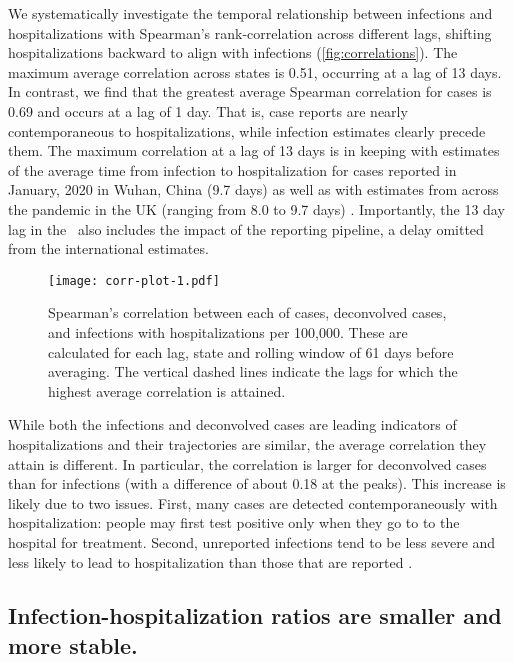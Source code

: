 We systematically investigate the temporal relationship between infections and
hospitalizations with Spearman's rank-correlation across different lags,
shifting hospitalizations backward to align with infections
(\autoref{fig:correlations}). The maximum average correlation across states is
0.51, occurring at a lag of 13 days. In contrast, we find that the greatest
average Spearman correlation for cases is 0.69 and occurs at a lag of 1 day.
That is, case reports are nearly contemporaneous to hospitalizations, while
infection estimates clearly precede them. The maximum correlation at a lag of 13
days is in keeping with estimates of the average time from infection to
hospitalization for cases reported in January, 2020 in Wuhan, China (9.7 days)
as well as with estimates from across the pandemic in the UK (ranging from 8.0
to 9.7 days) \citep{ward2021understanding}. Importantly, the 13 day lag in the
\US\ also includes the impact of the reporting pipeline, a delay omitted from
the international estimates. 

\begin{figure}[!tb]
\centering
\texttt{[image: corr-plot-1.pdf]} 
\caption{Spearman's correlation between each of cases, deconvolved cases, and
infections with hospitalizations per 100,000. These are calculated for each lag,
state and rolling window of 61 days before averaging. The vertical dashed lines
indicate the lags for which the highest average correlation is attained.}
\label{fig:correlations}
\end{figure}
    

While both the infections and deconvolved cases are leading indicators of
hospitalizations and their trajectories are similar, the average correlation
they attain is different. In particular, the correlation is larger for
deconvolved cases than for infections (with a difference of about 0.18 at the
peaks). This increase is likely due to two issues. First, many cases are
detected contemporaneously with hospitalization: people may first test
positive only when they go to to the hospital for treatment. Second, unreported
infections tend to be less severe and less likely to lead to hospitalization
than those that are reported \citep{sallahi2021using}.



\subsection{Infection-hospitalization ratios are smaller and more stable.}
\label{sec:ihrs}

